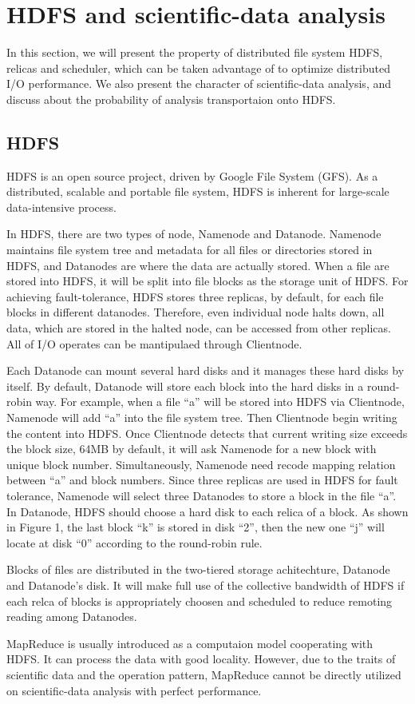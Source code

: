 \documentclass[preprint,12pt]{elsarticle}
\begin{document}
\section{HDFS and scientific-data analysis}
In this section, we will present the property of distributed file system HDFS, relicas and scheduler, which can be taken advantage
of to optimize distributed I/O performance. We also present the character of scientific-data analysis, and discuss about the 
probability of analysis transportaion onto HDFS.

\subsection{HDFS}
HDFS is an open source project, driven by Google File System (GFS). As a distributed, scalable and portable file system, HDFS is
inherent for large-scale data-intensive process. \par
In HDFS, there are two types of node, Namenode and Datanode. Namenode maintains file system tree and metadata for all files or
directories stored in HDFS, and Datanodes are where the data are actually stored. When a file are stored into HDFS, it will be
split into file blocks as the storage unit of HDFS. For achieving fault-tolerance, HDFS stores three replicas, by default, for each
file blocks in different datanodes. Therefore, even individual node halts down, all data, which are stored in the halted node, can
be accessed from other replicas. All of I/O operates can be mantipulaed through Clientnode. \par
Each Datanode can mount several hard disks and it manages these hard disks by itself. By default, Datanode will store each block
into the hard disks in a round-robin way. For example, when a file ``a'' will be stored into HDFS via Clientnode, Namenode will add
``a'' into the file system tree. Then Clientnode begin writing the content into HDFS. Once Clientnode detects that current writing
size exceeds the block size, 64MB by default, it will ask Namenode for a new block with unique block number. Simultaneously,
Namenode need recode mapping relation between ``a'' and block numbers. Since three replicas are used in HDFS for fault tolerance,
Namenode will select three Datanodes to store a block in the file ``a''. In Datanode, HDFS should choose a hard disk to each relica 
of a block. As shown in Figure 1, the last block ``k'' is stored in disk ``2'', then the new one ``j'' will locate at disk ``0'' 
according to the round-robin rule. \par
Blocks of files are distributed in the two-tiered storage achitechture, Datanode and Datanode's disk. It will make full use of the
collective bandwidth of HDFS if each relca of blocks is appropriately choosen and scheduled to reduce remoting reading among
Datanodes. \par
MapReduce is usually introduced as a computaion model cooperating with HDFS. It can process the data with good locality.
However, due to the traits of scientific data and the operation pattern, MapReduce cannot be directly utilized on scientific-data
analysis with perfect performance.
\end{document}
